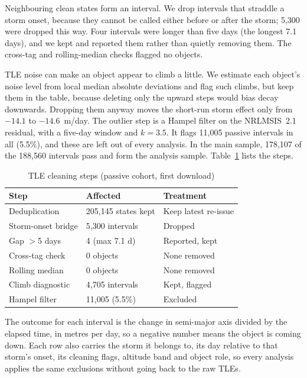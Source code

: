 Neighbouring clean states form an interval. We drop intervals that straddle a storm onset,
because they cannot be called either before or after the storm; 5,300 were dropped this way.
Four intervals were longer than five days (the longest 7.1 days), and we kept and reported them
rather than quietly removing them. The cross-tag and rolling-median checks flagged no objects.

TLE noise can make an object appear to climb a little. We estimate each object's noise level
from local median absolute deviations and flag such climbs, but keep them in the table, because
deleting only the upward steps would bias decay downwards. Dropping them anyway moves the
short-run storm effect only from $-14.1$ to $-14.6$~m/day. The outlier step is a Hampel filter
on the NRLMSIS~2.1 residual, with a five-day window and $k = 3.5$. It flags 11,005 passive
intervals in all (5.5\%), and these are left out of every analysis. In the main sample, 178,107
of the 188,560 intervals pass and form the analysis sample. Table~\ref{tab:cleaning} lists the steps.

\begin{table}[t]
\caption{TLE cleaning steps (passive cohort, first download)}
\label{tab:cleaning}
\centering
\small
\begin{tabular}{@{}p{2.55cm}p{2.45cm}p{2.5cm}@{}}
\toprule
Step & Affected & Treatment \\
\midrule
Deduplication & 205,145 states kept & Keep latest re-issue \\
Storm-onset bridge & 5,300 intervals & Dropped \\
Gap $>$5 days & 4 (max 7.1 d) & Reported, kept \\
Cross-tag check & 0 objects & None removed \\
Rolling median & 0 objects & None removed \\
Climb diagnostic & 4,705 intervals & Kept, flagged \\
Hampel filter & 11,005 (5.5\%) & Excluded \\
\bottomrule
\end{tabular}
\end{table}

The outcome for each interval is the change in semi-major axis divided by the elapsed time, in
metres per day, so a negative number means the object is coming down. Each row also carries the
storm it belongs to, its day relative to that storm's onset, its cleaning flags, altitude band
and object role, so every analysis applies the same exclusions without going back to the raw
TLEs.

